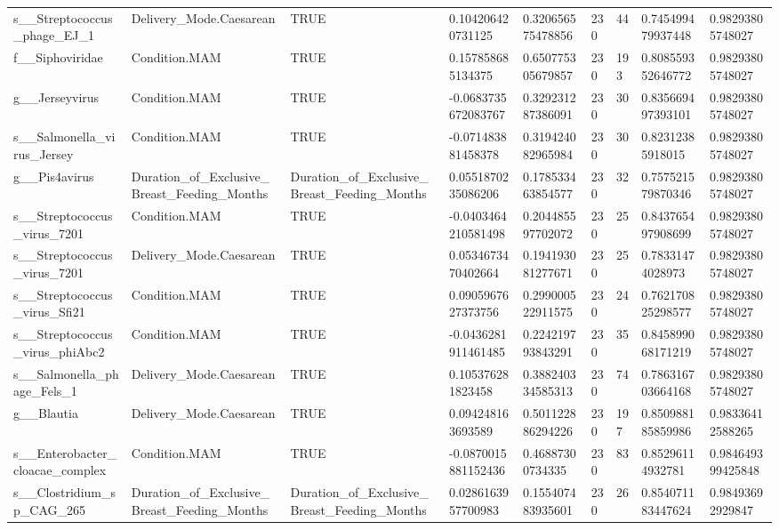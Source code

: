\begin{longtable}{lllllllll}
s\_\_Streptococcus\_phage\_EJ\_1 & Delivery\_Mode.Caesarean & TRUE & 0.104206420731125 & 0.320656575478856 & 230 & 44 & 0.745499479937448 & 0.98293805748027 \\
f\_\_Siphoviridae & Condition.MAM & TRUE & 0.157858685134375 & 0.650775305679857 & 230 & 193 & 0.808559352646772 & 0.98293805748027 \\
g\_\_Jerseyvirus & Condition.MAM & TRUE & -0.0683735672083767 & 0.329231287386091 & 230 & 30 & 0.835669497393101 & 0.98293805748027 \\
s\_\_Salmonella\_virus\_Jersey & Condition.MAM & TRUE & -0.071483881458378 & 0.319424082965984 & 230 & 30 & 0.82312385918015 & 0.98293805748027 \\
g\_\_Pis4avirus & Duration\_of\_Exclusive\_Breast\_Feeding\_Months & Duration\_of\_Exclusive\_Breast\_Feeding\_Months & 0.0551870235086206 & 0.178533463854577 & 230 & 32 & 0.757521579870346 & 0.98293805748027 \\
s\_\_Streptococcus\_virus\_7201 & Condition.MAM & TRUE & -0.0403464210581498 & 0.204485597702072 & 230 & 25 & 0.843765497908699 & 0.98293805748027 \\
s\_\_Streptococcus\_virus\_7201 & Delivery\_Mode.Caesarean & TRUE & 0.0534673470402664 & 0.194193081277671 & 230 & 25 & 0.78331474028973 & 0.98293805748027 \\
s\_\_Streptococcus\_virus\_Sfi21 & Condition.MAM & TRUE & 0.0905967627373756 & 0.299000522911575 & 230 & 24 & 0.762170825298577 & 0.98293805748027 \\
s\_\_Streptococcus\_virus\_phiAbc2 & Condition.MAM & TRUE & -0.0436281911461485 & 0.224219793843291 & 230 & 35 & 0.845899068171219 & 0.98293805748027 \\
s\_\_Salmonella\_phage\_Fels\_1 & Delivery\_Mode.Caesarean & TRUE & 0.105376281823458 & 0.388240334585313 & 230 & 74 & 0.786316703664168 & 0.98293805748027 \\
g\_\_Blautia & Delivery\_Mode.Caesarean & TRUE & 0.094248163693589 & 0.501122886294226 & 230 & 197 & 0.850988185859986 & 0.98336412588265 \\
s\_\_Enterobacter\_cloacae\_complex & Condition.MAM & TRUE & -0.0870015881152436 & 0.46887300734335 & 230 & 83 & 0.85296114932781 & 0.984649399425848 \\
s\_\_Clostridium\_sp\_CAG\_265 & Duration\_of\_Exclusive\_Breast\_Feeding\_Months & Duration\_of\_Exclusive\_Breast\_Feeding\_Months & 0.0286163957700983 & 0.155407483935601 & 230 & 26 & 0.854071183447624 & 0.98493692929847 \\

\end{longtable}
